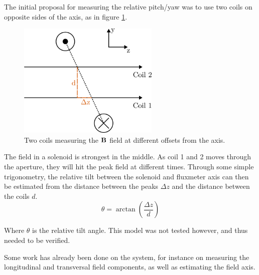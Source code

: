 The initial proposal for measuring the relative pitch/yaw was to
use two coils on opposite sides of the axis, as in figure \ref{fig:coil-dz}.

\begin{figure}[!h]
    \centering
    \includegraphics[width=0.6\textwidth]{figs/coil-dz}
    \caption{Two coils measuring the $\vb{B}$ field at different offsets
        from the axis.}
    \label{fig:coil-dz}
\end{figure}

The field in a solenoid is strongest in the middle. As coil 1
and 2 moves through the aperture, they will hit the peak field at different
times. Through some simple trigonometry, the relative tilt between the
solenoid and fluxmeter axis can then be estimated from the distance between
the peaks $\Delta z$ and the distance between the coils $d$.
\begin{equation}
    \theta = \arctan \left( \frac{\Delta z}{d} \right)
    \label{eq:angle_estimation}
\end{equation}

Where $\theta$ is the relative tilt angle.
This model was not tested however, and thus needed to be verified.


Some work has already been done on the system, for instance on measuring
the longitudinal and transversal field components, as well as estimating
the field axis. \cite{petrone_induction-coil_2022}